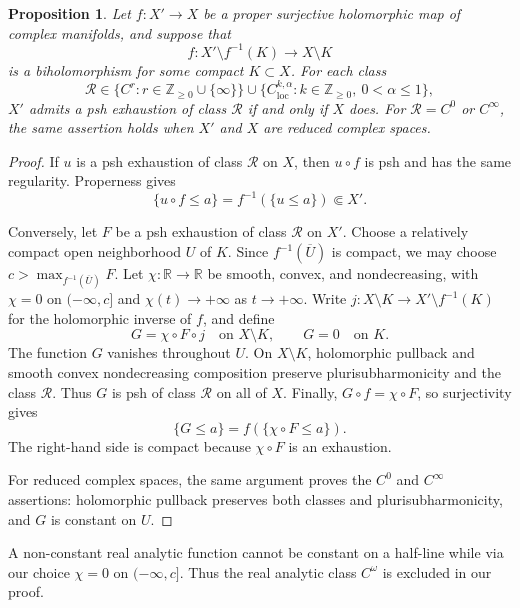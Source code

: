 \documentclass[11pt]{amsart}
\newtheorem{proposition}[theorem]{Proposition}
\theoremstyle{definition}
\theoremstyle{remark}
\numberwithin{equation}{section}
\newcommand{\R}{\mathbb R}
\begin{document}
\begin{proposition}\label{prop:compact-modification}
Let $f:X'\to X$ be a proper surjective holomorphic map of complex
manifolds, and suppose that
\[
 f:X'\setminus f^{-1}(K)\longrightarrow X\setminus K
\]
is a biholomorphism for some compact $K\subset X$. For each class
\[
 \mathcal R\in
 \{C^r:r\in\mathbb Z_{\ge0}\cup\{\infty\}\}
 \cup\{C^{k,\alpha}_{\mathrm{loc}}:
          k\in\mathbb Z_{\ge0},\ 0<\alpha\le1\},
\]
$X'$ admits a psh exhaustion of class $\mathcal R$ if and only if
$X$ does.
For $\mathcal R=C^0$ or $C^\infty$, the same assertion holds when
$X'$ and $X$ are reduced complex spaces.
\end{proposition}
\begin{proof}
If $u$ is a psh exhaustion of class $\mathcal R$ on $X$, then
$u\circ f$ is psh and has the same regularity. Properness gives
\[
 \{u\circ f\le a\}=f^{-1}(\{u\le a\})\Subset X'.
\]

Conversely, let $F$ be a psh exhaustion of class $\mathcal R$ on $X'$.
Choose a relatively compact open neighborhood $U$ of $K$. Since
$f^{-1}(\overline U)$ is compact, we may choose
$c>\max_{f^{-1}(\overline U)}F$. Let $\chi:\R\to\R$ be smooth,
convex, and nondecreasing, with $\chi=0$ on $(-\infty,c]$ and
$\chi(t)\to+\infty$ as $t\to+\infty$. Write
$j:X\setminus K\to X'\setminus f^{-1}(K)$ for the holomorphic
inverse of $f$, and define
\[
 G=\chi\circ F\circ j\quad\text{on }X\setminus K,
 \qquad G=0\quad\text{on }K.
\]
The function $G$ vanishes throughout $U$. On $X\setminus K$,
holomorphic pullback and smooth convex nondecreasing composition
preserve plurisubharmonicity and the class $\mathcal R$. Thus $G$
is psh of class $\mathcal R$ on all of $X$.
Finally, $G\circ f=\chi\circ F$, so surjectivity gives
\[
 \{G\le a\}=f(\{\chi\circ F\le a\}).
\]
The right-hand side is compact because $\chi\circ F$ is an
exhaustion.

For reduced complex spaces, the same argument proves the $C^0$
and $C^\infty$ assertions: holomorphic pullback preserves both
classes and plurisubharmonicity, and $G$ is constant on $U$.
\end{proof}

A non-constant real analytic function cannot be constant on a half-line while via our choice $\chi=0$ on $(-\infty,c]$. Thus the real analytic class $C^\omega$ is excluded in our proof.
\end{document}
